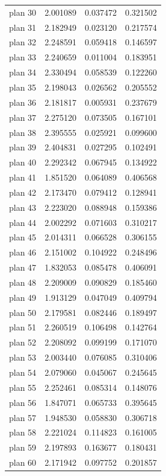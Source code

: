 \begin{table}[h!]
\begin{tabular}{lccc}
plan 30 & 2.001089 & 0.037472 & 0.321502 \\
plan 31 & 2.182949 & 0.023120 & 0.217574 \\
plan 32 & 2.248591 & 0.059418 & 0.146597 \\
plan 33 & 2.240659 & 0.011004 & 0.183951 \\
plan 34 & 2.330494 & 0.058539 & 0.122260 \\
plan 35 & 2.198043 & 0.026562 & 0.205552 \\
plan 36 & 2.181817 & 0.005931 & 0.237679 \\
plan 37 & 2.275120 & 0.073505 & 0.167101 \\
plan 38 & 2.395555 & 0.025921 & 0.099600 \\
plan 39 & 2.404831 & 0.027295 & 0.102491 \\
plan 40 & 2.292342 & 0.067945 & 0.134922 \\
plan 41 & 1.851520 & 0.064089 & 0.406568 \\
plan 42 & 2.173470 & 0.079412 & 0.128941 \\
plan 43 & 2.223020 & 0.088948 & 0.159386 \\
plan 44 & 2.002292 & 0.071603 & 0.310217 \\
plan 45 & 2.014311 & 0.066528 & 0.306155 \\
plan 46 & 2.151002 & 0.104922 & 0.248496 \\
plan 47 & 1.832053 & 0.085478 & 0.406091 \\
plan 48 & 2.209009 & 0.090829 & 0.185460 \\
plan 49 & 1.913129 & 0.047049 & 0.409794 \\
plan 50 & 2.179581 & 0.082446 & 0.189497 \\
plan 51 & 2.260519 & 0.106498 & 0.142764 \\
plan 52 & 2.208092 & 0.099199 & 0.171070 \\
plan 53 & 2.003440 & 0.076085 & 0.310406 \\
plan 54 & 2.079060 & 0.045067 & 0.245645 \\
plan 55 & 2.252461 & 0.085314 & 0.148076 \\
plan 56 & 1.847071 & 0.065733 & 0.395645 \\
plan 57 & 1.948530 & 0.058830 & 0.306718 \\
plan 58 & 2.221024 & 0.114823 & 0.161005 \\
plan 59 & 2.197893 & 0.163677 & 0.180431 \\
plan 60 & 2.171942 & 0.097752 & 0.201857 \\

\end{tabular}
\end{table}
